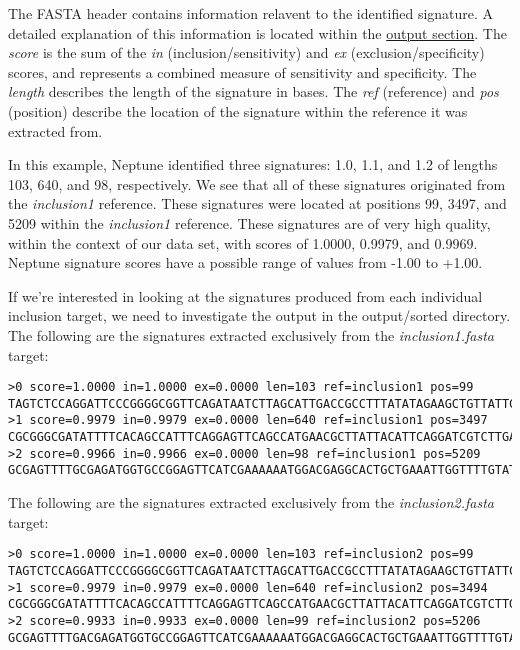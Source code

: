 \documentclass[a4paper,10pt]{article}
\begin{document}
The FASTA header contains information relavent to the identified signature. A detailed explanation of this information is located within the \hyperref[section:output]{output section}. The \textit{score} is the sum of the \textit{in} (inclusion/sensitivity) and \textit{ex} (exclusion/specificity) scores, and represents a combined measure of sensitivity and specificity. The \textit{length} describes the length of the signature in bases. The \textit{ref} (reference) and \textit{pos} (position) describe the location of the signature within the reference it was extracted from.

In this example, Neptune identified three signatures: 1.0, 1.1, and 1.2 of lengths 103, 640, and 98, respectively. We see that all of these signatures originated from the \textit{inclusion1} reference. These signatures were located at positions 99, 3497, and 5209 within the \textit{inclusion1} reference. These signatures are of very high quality, within the context of our data set, with scores of 1.0000, 0.9979, and 0.9969. Neptune signature scores have a possible range of values from -1.00 to +1.00.

If we're interested in looking at the signatures produced from each individual inclusion target, we need to investigate the output in the output/sorted directory. The following are the signatures extracted exclusively from the \textit{inclusion1.fasta} target:

\begin{minipage}{\linewidth}
\begin{lstlisting}[frame=single, style=bash, title=output/sorted/inclusion1.fasta]
>0 score=1.0000 in=1.0000 ex=0.0000 len=103 ref=inclusion1 pos=99
TAGTCTCCAGGATTCCCGGGGCGGTTCAGATAATCTTAGCATTGACCGCCTTTATATAGAAGCTGTTATTCAAGAAGCAT...
>1 score=0.9979 in=0.9979 ex=0.0000 len=640 ref=inclusion1 pos=3497
CGCGGGCGATATTTTCACAGCCATTTCAGGAGTTCAGCCATGAACGCTTATTACATTCAGGATCGTCTTGAGGCTCAGAG...
>2 score=0.9966 in=0.9966 ex=0.0000 len=98 ref=inclusion1 pos=5209
GCGAGTTTTGCGAGATGGTGCCGGAGTTCATCGAAAAAATGGACGAGGCACTGCTGAAATTGGTTTTGTATTTGGGGAGC...
\end{lstlisting}
\end{minipage}

The following are the signatures extracted exclusively from the \textit{inclusion2.fasta} target:

\begin{minipage}{\linewidth}
\begin{lstlisting}[frame=single, style=bash, title=output/sorted/inclusion2.fasta]
>0 score=1.0000 in=1.0000 ex=0.0000 len=103 ref=inclusion2 pos=99
TAGTCTCCAGGATTCCCGGGGCGGTTCAGATAATCTTAGCATTGACCGCCTTTATATAGAAGCTGTTATTCAAGAAGCAT...
>1 score=0.9979 in=0.9979 ex=0.0000 len=640 ref=inclusion2 pos=3494
CGCGGGCGATATTTTCACAGCCATTTTCAGGAGTTCAGCCATGAACGCTTATTACATTCAGGATCGTCTTGAGGCTCAGA...
>2 score=0.9933 in=0.9933 ex=0.0000 len=99 ref=inclusion2 pos=5206
GCGAGTTTTGACGAGATGGTGCCGGAGTTCATCGAAAAAATGGACGAGGCACTGCTGAAATTGGTTTTGTATTTGGGGAG...
\end{lstlisting}
\end{minipage}
\end{document}

